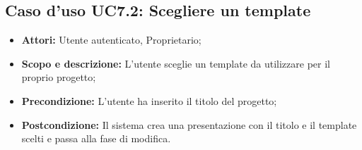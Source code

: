 \subsection{Caso d'uso UC7.2: Scegliere un template}
\begin{itemize}
	\item \textbf{Attori:} Utente autenticato, Proprietario;
	\item \textbf{Scopo e descrizione:} L'utente sceglie un template da utilizzare per il proprio progetto;
	\item \textbf{Precondizione:} L'utente ha inserito il titolo del progetto;
	\item \textbf{Postcondizione:} Il sistema crea una presentazione con il titolo e il template scelti e passa alla fase di modifica.
\end{itemize}